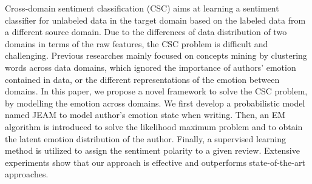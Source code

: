 Cross-domain sentiment classification (CSC) aims at learning a sentiment classifier for unlabeled data in the target domain based on the labeled data from a different source domain. Due to the differences of data distribution of two domains in terms of the raw features, the CSC problem is difficult and challenging. Previous researches mainly focused on concepts mining by clustering words across data domains, which ignored the importance of authors' emotion contained in data, or the different representations of the emotion between domains. In this paper, we propose a novel framework to solve the CSC problem, by modelling the emotion across domains. We first develop a probabilistic model named JEAM to model author's emotion state when writing. Then, an EM algorithm is introduced to solve the likelihood maximum problem and to obtain the latent emotion distribution of the author. Finally, a supervised learning method is utilized to assign the sentiment polarity to a given review. Extensive experiments show that our approach is effective and outperforms state-of-the-art approaches.
